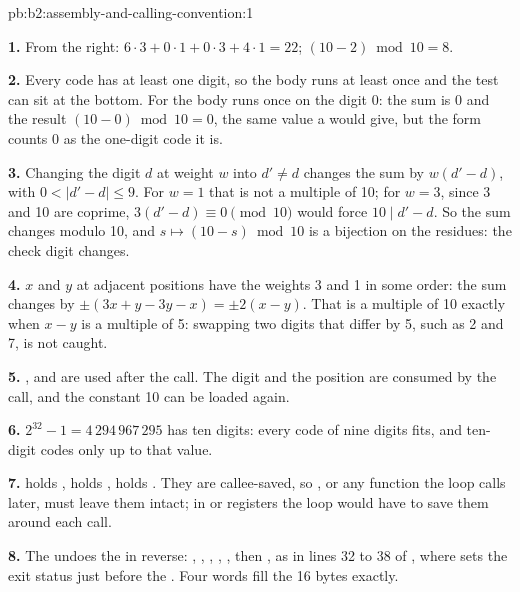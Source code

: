 \begin{solution}{pb:b2:assembly-and-calling-convention:1}

\textbf{1.} From the right: $6 \cdot 3 + 0 \cdot 1 + 0 \cdot 3 + 4 \cdot 1 = 22$; $(10 - 2) \bmod 10 = 8$.

\textbf{2.} Every code has at least one digit, so the body runs at least once and the test can sit at the bottom.
For  the body runs once on the digit 0: the sum is 0 and the result $(10 - 0) \bmod 10 = 0$, the
same value a  would give, but the  form counts 0 as the one-digit code it is.

\textbf{3.} Changing the digit $d$ at weight $w$ into $d' \ne d$ changes the sum by $w(d' - d)$, with $0 < |d' - d|
\le 9$. For $w = 1$ that is not a multiple of 10; for $w = 3$, since 3 and 10 are coprime, $3(d' - d) \equiv 0
\pmod{10}$ would force $10 \mid d' - d$. So the sum changes modulo 10, and $s \mapsto (10 - s) \bmod 10$ is a
bijection on the residues: the check digit changes.

\textbf{4.} $x$ and $y$ at adjacent positions have the weights 3 and 1 in some order: the sum changes by $\pm(3x + y
- 3y - x) = \pm 2(x - y)$. That is a multiple of 10 exactly when $x - y$ is a multiple of 5: swapping two digits that
differ by 5, such as 2 and 7, is not caught.

\textbf{5.} ,  and  are used after the call. The digit and the position are consumed by
the call, and the constant 10 can be loaded again.

\textbf{6.} $2^{32} - 1 = 4\,294\,967\,295$ has ten digits: every code of nine digits fits, and ten-digit codes only up
to that value.

\textbf{7.}  holds ,  holds ,  holds . They are callee-saved,
so , or any function the loop calls later, must leave them intact; in  or  registers the
loop would have to save them around each call.

\textbf{8.} The  undoes the  in reverse: , , , , , then , as in lines 32 to 38 of ,
where  sets the exit status just before the . Four words fill the 16 bytes exactly.


\end{solution}
